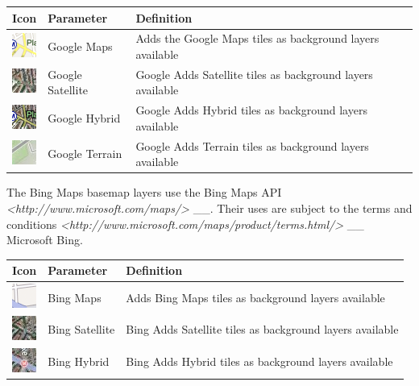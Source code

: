 \documentclass[letterpaper,10pt,english]{sphinxmanual}
\begin{document}
\begin{tabulary}{\linewidth}{|L|L|L|}
\hline

\textbf{Icon}
 & 
\textbf{Parameter}
 & 
\textbf{Definition}
\\
\hline
\includegraphics{gmap-layer-icon.png}
 & 
Google Maps
 & 
Adds the Google Maps tiles as background layers available
\\
\hline
\includegraphics{gsat-layer-icon.png}
 & 
Google Satellite
 & 
Google Adds Satellite tiles as background layers available
\\
\hline
\includegraphics{ghyb-layer-icon.png}
 & 
Google Hybrid
 & 
Google Adds Hybrid tiles as background layers available
\\
\hline
\includegraphics{gter-layer-icon.png}
 & 
Google Terrain
 & 
Google Adds Terrain tiles as background layers available
\\
\hline\end{tabulary}


The Bing Maps basemap layers use the Bing Maps API \emph{\textless{}http://www.microsoft.com/maps/\textgreater{}} \_\_. Their uses are subject to the terms and conditions \emph{\textless{}http://www.microsoft.com/maps/product/terms.html/\textgreater{}} \_\_ Microsoft Bing.

\begin{tabulary}{\linewidth}{|L|L|L|}
\hline

\textbf{Icon}
 & 
\textbf{Parameter}
 & 
\textbf{Definition}
\\
\hline
\includegraphics{bstr-layer-icon.png}
 & 
Bing Maps
 & 
Adds Bing Maps tiles as background layers available
\\
\hline
\includegraphics{bsat-layer-icon.png}
 & 
Bing Satellite
 & 
Bing Adds Satellite tiles as background layers available
\\
\hline
\includegraphics{bhyb-layer-icon.png}
 & 
Bing Hybrid
 & 
Bing Adds Hybrid tiles as background layers available
\\
\hline\end{tabulary}
\end{document}

